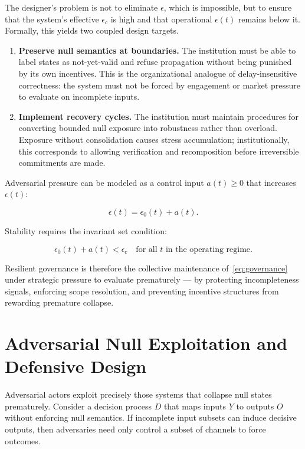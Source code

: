 \documentclass[11pt]{article}
\theoremstyle{remark}
\begin{document}
The designer's problem is not to eliminate $\epsilon$, which is impossible, but to ensure that the system's effective $\epsilon_c$ is high and that operational $\epsilon(t)$ remains below it. Formally, this yields two coupled design targets.

\begin{enumerate}
  \item \textbf{Preserve null semantics at boundaries.} The institution must be able to label states as not-yet-valid and refuse propagation without being punished by its own incentives. This is the organizational analogue of delay-insensitive correctness: the system must not be forced by engagement or market pressure to evaluate on incomplete inputs.

  \item \textbf{Implement recovery cycles.} The institution must maintain procedures for converting bounded null exposure into robustness rather than overload. Exposure without consolidation causes stress accumulation; institutionally, this corresponds to allowing verification and recomposition before irreversible commitments are made.
\end{enumerate}

Adversarial pressure can be modeled as a control input $a(t) \geq 0$ that increases $\epsilon(t)$:

\[
\epsilon(t) = \epsilon_0(t) + a(t).
\]

Stability requires the invariant set condition:

\begin{equation}
\epsilon_0(t) + a(t) < \epsilon_c \quad \text{for all } t \text{ in the operating regime.}
\label{eq:governance}
\end{equation}

Resilient governance is therefore the collective maintenance of~\eqref{eq:governance} under strategic pressure to evaluate prematurely --- by protecting incompleteness signals, enforcing scope resolution, and preventing incentive structures from rewarding premature collapse.

\section{Adversarial Null Exploitation and Defensive Design}
\label{sec:adversarial}

Adversarial actors exploit precisely those systems that collapse null states prematurely. Consider a decision process $D$ that maps inputs $Y$ to outputs $O$ without enforcing null semantics. If incomplete input subsets can induce decisive outputs, then adversaries need only control a subset of channels to force outcomes.
\end{document}
